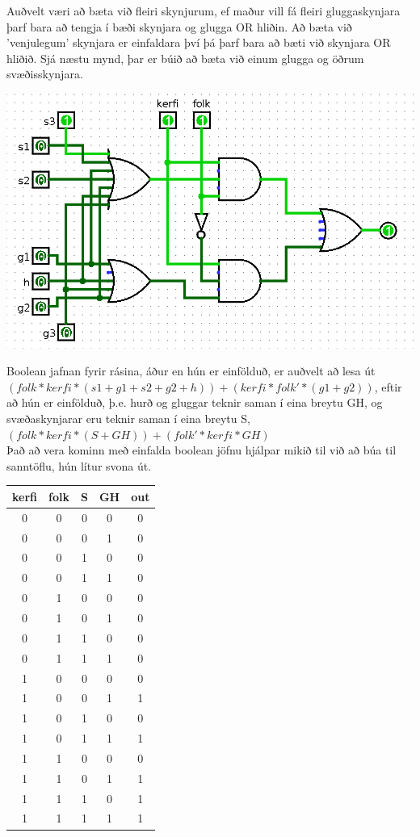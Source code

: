 \documentclass{article}
\begin{document}
Auðvelt væri að bæta við fleiri skynjurum, 
ef maður vill fá fleiri gluggaskynjara þarf bara að tengja í bæði skynjara og glugga OR hliðin. 
Að bæta við 'venjulegum' skynjara er einfaldara því þá þarf bara að bæti við skynjara OR hliðið.
Sjá næstu mynd, þar er búið að bæta við einum glugga og öðrum svæðisskynjara.
\begin{center}
    \includegraphics[scale=0.32]{rasVidbaett.png}
\end{center}

Boolean jafnan fyrir rásina, áður en hún er einfölduð, er auðvelt að lesa út 
$(folk*kerfi*(s1 + g1 + s2 + g2 + h)) + (kerfi*folk'*(g1 + g2))$, 
eftir að hún er einfölduð, þ.e. hurð og gluggar teknir saman í eina breytu GH, 
og svæðaskynjarar eru teknir saman í eina breytu S,\\
$(folk*kerfi*(S+GH)) + (folk'*kerfi*GH)$\\
Það að vera kominn með einfalda boolean jöfnu hjálpar mikið til við að búa til sanntöflu, hún lítur svona  út.
\begin{center}
    \begin{tabular}{|c|c|c|c|c|}
        \hline
        kerfi&folk&S&GH&out\\
        \hline
        0&0&0&0&0\\
        0&0&0&1&0\\
        0&0&1&0&0\\
        0&0&1&1&0\\
        0&1&0&0&0\\
        0&1&0&1&0\\
        0&1&1&0&0\\
        0&1&1&1&0\\
        1&0&0&0&0\\
        1&0&0&1&1\\
        1&0&1&0&0\\
        1&0&1&1&1\\
        1&1&0&0&0\\
        1&1&0&1&1\\
        1&1&1&0&1\\
        1&1&1&1&1\\
        \hline
    \end{tabular}
\end{center}
\end{document}
